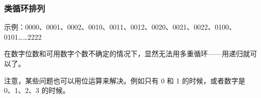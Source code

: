 \subsubsection{类循环排列}
	示例：0000、0001、0002、0010、0011、0012、0020、0021、0022、0100、0101\ldots\ldots{}2222
	
	在数字位数和可用数字个数不确定的情况下，显然无法用多重循环------用递归就可以了。
	
	注意，某些问题也可以用位运算来解决。例如只有 0 和 1 的时候，或者数字是 0、1、2、3 的时候。